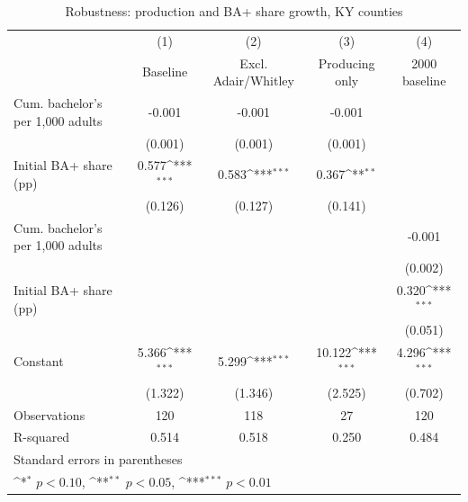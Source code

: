\begin{table}[htbp]\centering
\def\sym#1{\ifmmode^{#1}\else\(^{#1}\)\fi}
\caption{Robustness: production and BA+ share growth, KY counties}
\begin{tabular}{l*{4}{c}}
\toprule
            &\multicolumn{1}{c}{(1)}&\multicolumn{1}{c}{(2)}&\multicolumn{1}{c}{(3)}&\multicolumn{1}{c}{(4)}\\
            &\multicolumn{1}{c}{Baseline}&\multicolumn{1}{c}{Excl. Adair/Whitley}&\multicolumn{1}{c}{Producing only}&\multicolumn{1}{c}{2000 baseline}\\
\midrule
Cum. bachelor's per 1,000 adults&      -0.001         &      -0.001         &      -0.001         &                     \\
            &     (0.001)         &     (0.001)         &     (0.001)         &                     \\
\addlinespace
Initial BA+ share (pp)&       0.577\sym{***}&       0.583\sym{***}&       0.367\sym{**} &                     \\
            &     (0.126)         &     (0.127)         &     (0.141)         &                     \\
\addlinespace
Cum. bachelor's per 1,000 adults&                     &                     &                     &      -0.001         \\
            &                     &                     &                     &     (0.002)         \\
\addlinespace
Initial BA+ share (pp)&                     &                     &                     &       0.320\sym{***}\\
            &                     &                     &                     &     (0.051)         \\
\addlinespace
Constant    &       5.366\sym{***}&       5.299\sym{***}&      10.122\sym{***}&       4.296\sym{***}\\
            &     (1.322)         &     (1.346)         &     (2.525)         &     (0.702)         \\
\midrule
Observations&         120         &         118         &          27         &         120         \\
R-squared   &       0.514         &       0.518         &       0.250         &       0.484         \\
\bottomrule
\multicolumn{5}{l}{\footnotesize Standard errors in parentheses}\\
\multicolumn{5}{l}{\footnotesize \sym{*} \(p<0.10\), \sym{**} \(p<0.05\), \sym{***} \(p<0.01\)}\\
\end{tabular}
\end{table}
